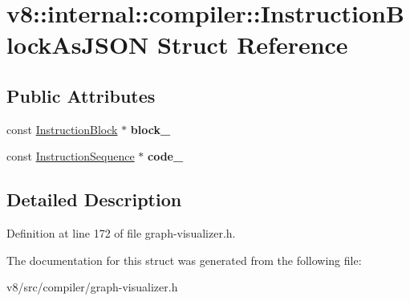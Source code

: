 \hypertarget{structv8_1_1internal_1_1compiler_1_1InstructionBlockAsJSON}{}\section{v8\+:\+:internal\+:\+:compiler\+:\+:Instruction\+Block\+As\+J\+S\+ON Struct Reference}
\label{structv8_1_1internal_1_1compiler_1_1InstructionBlockAsJSON}
\subsection*{Public Attributes}
\begin{DoxyCompactItemize}
\item 
\mbox{\label{structv8_1_1internal_1_1compiler_1_1InstructionBlockAsJSON_ab67422854acb6dea72d7922778287689}} 
const \mbox{\hyperlink{classv8_1_1internal_1_1compiler_1_1InstructionBlock}{Instruction\+Block}} $\ast$ {\bfseries block\+\_\+}
\item 
\mbox{\label{structv8_1_1internal_1_1compiler_1_1InstructionBlockAsJSON_a86dd601a65e22b6b3ecfdf7f516b3b05}} 
const \mbox{\hyperlink{classv8_1_1internal_1_1compiler_1_1InstructionSequence}{Instruction\+Sequence}} $\ast$ {\bfseries code\+\_\+}
\end{DoxyCompactItemize}


\subsection{Detailed Description}


Definition at line 172 of file graph-\/visualizer.\+h.



The documentation for this struct was generated from the following file\+:\begin{DoxyCompactItemize}
\item 
v8/src/compiler/graph-\/visualizer.\+h\end{DoxyCompactItemize}
